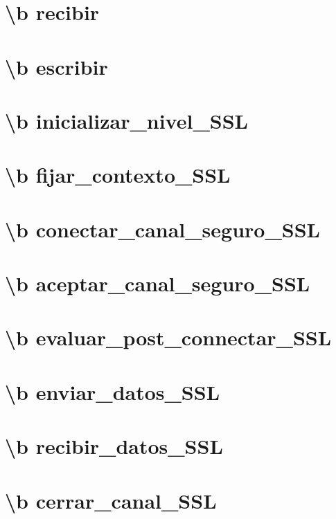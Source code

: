 \documentclass[twoside]{book}
\begin{document}
\chapter{\textbackslash{}b recibir}
\label{recibir}
\hypertarget{recibir}{}

\chapter{\textbackslash{}b escribir}
\label{escribir}
\hypertarget{escribir}{}

\chapter{\textbackslash{}b inicializar\-\_\-nivel\-\_\-\-S\-S\-L}
\label{inicializar_nivel__s_s_l}
\hypertarget{inicializar_nivel__s_s_l}{}

\chapter{\textbackslash{}b fijar\-\_\-contexto\-\_\-\-S\-S\-L}
\label{fijar_contexto__s_s_l}
\hypertarget{fijar_contexto__s_s_l}{}

\chapter{\textbackslash{}b conectar\-\_\-canal\-\_\-seguro\-\_\-\-S\-S\-L}
\label{conectar_canal_seguro__s_s_l}
\hypertarget{conectar_canal_seguro__s_s_l}{}

\chapter{\textbackslash{}b aceptar\-\_\-canal\-\_\-seguro\-\_\-\-S\-S\-L}
\label{aceptar_canal_seguro__s_s_l}
\hypertarget{aceptar_canal_seguro__s_s_l}{}

\chapter{\textbackslash{}b evaluar\-\_\-post\-\_\-connectar\-\_\-\-S\-S\-L}
\label{evaluar_post_connectar__s_s_l}
\hypertarget{evaluar_post_connectar__s_s_l}{}

\chapter{\textbackslash{}b enviar\-\_\-datos\-\_\-\-S\-S\-L}
\label{enviar_datos__s_s_l}
\hypertarget{enviar_datos__s_s_l}{}

\chapter{\textbackslash{}b recibir\-\_\-datos\-\_\-\-S\-S\-L}
\label{recibir_datos__s_s_l}
\hypertarget{recibir_datos__s_s_l}{}

\chapter{\textbackslash{}b cerrar\-\_\-canal\-\_\-\-S\-S\-L}
\label{cerrar_canal__s_s_l}
\hypertarget{cerrar_canal__s_s_l}{}


\newpage
{}
{}
\printindex
\end{document}
